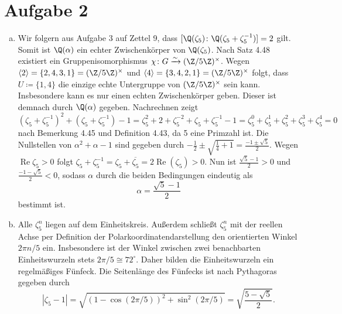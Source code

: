 \documentclass{article}
\begin{document}
\section*{Aufgabe 2}
\begin{enumerate}[(a)]
    \item Wir folgern aus Aufgabe 3 auf Zettel 9, dass $[\Q(\zeta_5) \colon \Q(\zeta_5 + \zeta_5^{-1})] = 2$ gilt.
    Somit ist $\Q(\alpha)$ ein echter Zwischenkörper von $\Q(\zeta_5)$.
    Nach Satz 4.48 existiert ein Gruppenisomorphismus $\chi\colon G \xrightarrow{\sim} (\Z/5\Z)^\times$. %
    Wegen $\langle 2 \rangle = \{2, 4, 3, 1\} = (\Z/5\Z)^\times$ und $\langle 4 \rangle = \{3, 4, 2, 1\} = (\Z/5\Z)^\times$ folgt, 
    dass $U \coloneqq \{1,4\}$ die einzige echte Untergruppe von $(\Z/5\Z)^\times$ sein kann.
    Insbesondere kann es nur einen echten Zwischenkörper geben. Dieser ist demnach durch $\Q(\alpha)$ gegeben.
    Nachrechnen zeigt
    \[
        (\zeta_5 + \zeta_5^{-1})^2 + (\zeta_5 + \zeta_5^{-1}) -1 
        = \zeta_5^2 + 2 + \zeta_5^{-2} + \zeta_5 + \zeta_5^{-1} -1 
        = \zeta_5^0 + \zeta_5^1 + \zeta_5^2 + \zeta_5^3 + \zeta_5^4 = 0
    \]
    nach Bemerkung 4.45 und Definition 4.43, da 5 eine Primzahl ist.
    Die Nullstellen von $\alpha^2 + \alpha -1$ sind gegeben durch $- \frac{1}{2} \pm \sqrt{\frac{1}{4} +1 } = \frac{-1 \pm \sqrt{5}}{2}$.
    Wegen $\operatorname{Re} \zeta_5 > 0$ folgt 
    $\zeta_5 + \zeta_5^{-1} = \zeta_5 + \overline{\zeta_5} = 2 \operatorname{Re}(\zeta_5) > 0$.
    Nun ist $\frac{\sqrt{5}-1}{2} > 0$ und $\frac{-1-\sqrt{5}}{2} < 0$, sodass $\alpha$ durch die beiden Bedingungen eindeutig als
    \[
      \alpha = \frac{\sqrt{5}-1}{2}  
    \] 
    bestimmt ist.
    \item Alle $\zeta_5^n$ liegen auf dem Einheitskreis. Außerdem schließt $\zeta_5^n$ mit der reellen Achse per Definition
    der Polarkoordinatendarstellung den orientierten Winkel $2\pi n/5$ ein. Insbesondere ist der Winkel zwischen zwei benachbarten
    Einheitswurzeln stets $2\pi /5 \cong 72^\circ$. Daher bilden die Einheitswurzeln ein regelmäßiges Fünfeck.
    Die Seitenlänge des Fünfecks ist nach Pythagoras gegeben durch 
    \[ 
        |\zeta_5 - 1| = \sqrt{(1- \cos(2\pi/5))^2 + \sin^2(2\pi/5)} = \sqrt{\frac{5 - \sqrt{5}}{2}}.
    \]
\end{enumerate}
\end{document}
